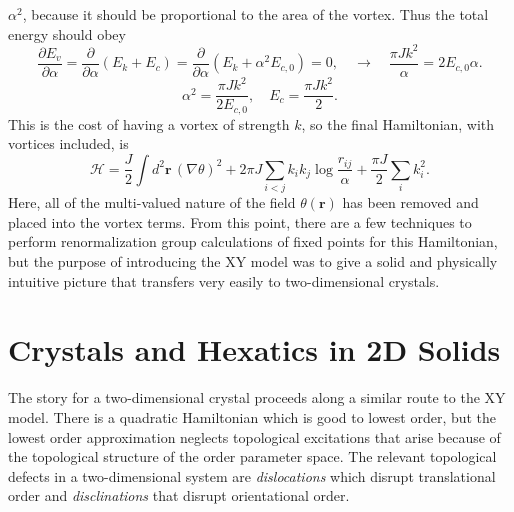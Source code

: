 \documentclass[a4paper,10pt]{article}
\newcommand{\beq}{\begin{equation}}
\newcommand{\eeq}{\end{equation}}
\renewcommand{\a}{\alpha}
\renewcommand{\th}{\theta}
\newcommand{\pder}[2]{\frac{\partial {#1}}{\partial {#2}}}
\newcommand{\paren}[1]{\left(#1\right)}
\newcommand{\goto}{\rightarrow}
\newcommand{\bv}[1]{\mathbf{#1}}
\newcommand{\br}{\ensuremath{\bv{r}}}
\begin{document}
$\a^2$, because it should be proportional to the area of the vortex. Thus the 
total energy should obey
\[ \pder{E_v}{\a} = \pder{}{\a}\paren{E_k + E_c} = \pder{}{\a}\paren{E_k + 
\a^2E_{c,0}} = 0, \quad \goto \quad \frac{\pi J k^2}{\a} = 2 E_{c,0}\a.\]
\beq \a^2 = \frac{\pi J k^2}{2 E_{c,0}},\quad E_c = \frac{\pi J 
k^2}{2}.\eeq
This is the cost of having a vortex of strength $k$, so the final Hamiltonian, 
with vortices included, is
\beq \mathcal H = \frac{J}{2}\int d^2\br \, \paren{\nabla \th}^2 + 
2\pi J\sum_{i<j} k_ik_j \log{\frac{r_{ij}}{\a} } + \frac{\pi 
J}{2}\sum_i k_i^2. \eeq
Here, all of the multi-valued nature of the field $\th(\br)$ has been removed 
and placed into the vortex terms. From this point, there are a few techniques 
to perform renormalization group calculations of fixed points for this 
Hamiltonian, but the purpose of introducing the XY model was to give a solid 
and physically intuitive picture that transfers very easily to two-dimensional 
crystals.

\section{Crystals and Hexatics in 2D Solids}
The story for a two-dimensional crystal proceeds along a similar route to the 
XY model. There is a quadratic Hamiltonian which is good to lowest order, but 
the lowest order approximation neglects topological excitations that arise 
because of the topological structure of the order parameter space. The relevant 
topological defects in a two-dimensional system are \emph{dislocations} which 
disrupt translational order and \emph{disclinations} that disrupt orientational 
order.
\end{document}
